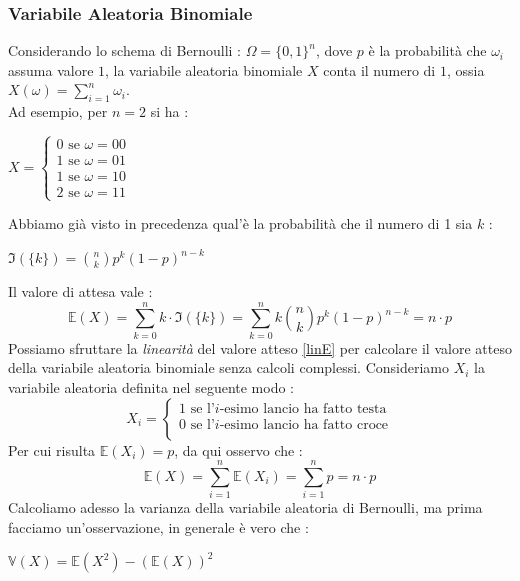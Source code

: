 \documentclass[12pt, letterpaper]{article}
\newcommand{\E}{{\mathbb E}}
\newcommand{\V}{{\mathbb V}}
\begin{document}
\subsubsection{Variabile Aleatoria Binomiale}\label{valBin}
Considerando lo schema di Bernoulli : \(\Omega=\{0,1\}^n\), dove \(p\) è la probabilità che \(\omega_i\) assuma 
valore \(1\), la variabile aleatoria binomiale \(X\) conta 
il numero di \(1\), ossia \(X(\omega)=\displaystyle \sum_{i=1}^n\omega_i\). \\Ad esempio, per \(n=2\) si ha : 
\begin{center}
    \(
    X=\begin{cases}
        0\text{ se }\omega=00\\
        1\text{ se  }\omega=01\\
        1\text{  se }\omega=10\\
        2\text{ se  }\omega=11
    \end{cases}    
    \)
\end{center}
Abbiamo già visto in precedenza qual'è la probabilità che il numero di 1 sia \(k\) :\begin{center} 
    \(\Im(\{k\})=\displaystyle \binom{n}{k}p^k(1-p)^{n-k}\)\end{center}
    Il valore di attesa vale :
    \begin{equation}
        \mathbb{E}(X)=\sum_{k=0}^nk\cdot \Im(\{k\})=\sum_{k=0}^nk\binom{n}{k}p^k(1-p)^{n-k}=n\cdot p
    \end{equation}
Possiamo sfruttare la \textit{linearità} del valore atteso \ref{linE} per calcolare il valore atteso 
della variabile aleatoria binomiale senza calcoli complessi.
Consideriamo \(X_i\) la variabile aleatoria definita nel seguente modo : \begin{equation}
    X_i=\begin{cases}
        1 \text{ se l'}i\text{-esimo lancio ha fatto testa}\\
        0 \text{ se l'}i\text{-esimo lancio ha fatto croce}\\
    \end{cases}
\end{equation}
Per cui risulta \(\E(X_i)=p\), da qui osservo che :\begin{equation}
    \E(X)=\sum_{i=1}^n\E(X_i)=\sum_{i=1}^np=n\cdot p
\end{equation}
Calcoliamo adesso la varianza della variabile aleatoria di Bernoulli, ma prima facciamo un'osservazione, in generale
è vero che  :\begin{center}
    \(\V(X)=\E(X^2)-(\E(X))^2\)
\end{center}
\end{document}
